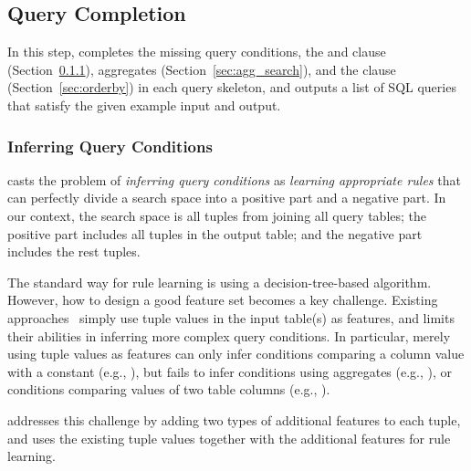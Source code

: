 \subsection{Query Completion}
\label{sec:completion}



In this step, \ourtool completes the missing query conditions, the
 and  clause (Section~\ref{sec:condition}),
aggregates (Section~\ref{sec:agg_search}), and
the  clause (Section~\ref{sec:orderby})
in each query skeleton, and
outputs a list of SQL queries
that satisfy the given example input and output.



\subsubsection{Inferring Query Conditions}
\label{sec:condition}

\ourtool casts the problem of \textit{inferring query conditions} as
 \textit{learning appropriate rules} that can perfectly divide a search space
into a positive part and a negative part. In our context, the search space
is all tuples from joining all query tables; the positive part
includes all tuples in the output table; and the negative part includes the rest
tuples.

The standard way for rule learning is using a decision-tree-based
algorithm. However, how to design a good feature set
becomes a key challenge.
Existing approaches~\cite{Tran:2009} simply use
tuple values in the input table(s) as features, 
and limits their abilities in inferring more
complex query conditions. In particular,
merely using tuple values as features can only infer
conditions comparing a column value with a constant
(e.g., ), but
fails to infer conditions using aggregates (e.g., ),
or conditions comparing values of two table columns
(e.g., ).



\ourtool addresses this challenge by adding two types of
additional features to each tuple, and uses
the existing tuple values together with the additional features
for rule learning.

